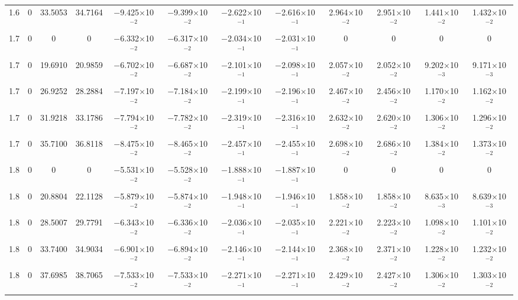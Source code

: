 \documentclass[aps,prd,twocolumn,showpacs,groupedaddress,nofootinbib]{revtex4}
\begin{document}
\begin{widetext}
\begin{table}[h]
\begin{tabular}{|c|c|c|c|c|c|c|c|c|c|c|c|}
  1.6&  0& 33.5053& 34.7164& $-$9.425$\times$10$^{-2}$& $-$9.399$\times$10$^{-2}$& $-$2.622$\times$10$^{-1}$& $-$2.616$\times$10$^{-1}$&  2.964$\times$10$^{-2}$&  2.951$\times$10$^{-2}$&  1.441$\times$10$^{-2}$&  1.432$\times$10$^{-2}$\\
  1.7&  0&  0&  0& $-$6.332$\times$10$^{-2}$& $-$6.317$\times$10$^{-2}$& $-$2.034$\times$10$^{-1}$& $-$2.031$\times$10$^{-1}$&  0&  0&  0&  0\\
  1.7&  0& 19.6910& 20.9859& $-$6.702$\times$10$^{-2}$& $-$6.687$\times$10$^{-2}$& $-$2.101$\times$10$^{-1}$& $-$2.098$\times$10$^{-1}$&  2.057$\times$10$^{-2}$&  2.052$\times$10$^{-2}$&  9.202$\times$10$^{-3}$&  9.171$\times$10$^{-3}$\\
  1.7&  0& 26.9252& 28.2884& $-$7.197$\times$10$^{-2}$& $-$7.184$\times$10$^{-2}$& $-$2.199$\times$10$^{-1}$& $-$2.196$\times$10$^{-1}$&  2.467$\times$10$^{-2}$&  2.456$\times$10$^{-2}$&  1.170$\times$10$^{-2}$&  1.162$\times$10$^{-2}$\\
  1.7&  0& 31.9218& 33.1786& $-$7.794$\times$10$^{-2}$& $-$7.782$\times$10$^{-2}$& $-$2.319$\times$10$^{-1}$& $-$2.316$\times$10$^{-1}$&  2.632$\times$10$^{-2}$&  2.620$\times$10$^{-2}$&  1.306$\times$10$^{-2}$&  1.296$\times$10$^{-2}$\\
  1.7&  0& 35.7100& 36.8118& $-$8.475$\times$10$^{-2}$& $-$8.465$\times$10$^{-2}$& $-$2.457$\times$10$^{-1}$& $-$2.455$\times$10$^{-1}$&  2.698$\times$10$^{-2}$&  2.686$\times$10$^{-2}$&  1.384$\times$10$^{-2}$&  1.373$\times$10$^{-2}$\\
  1.8&  0&  0&  0& $-$5.531$\times$10$^{-2}$& $-$5.528$\times$10$^{-2}$& $-$1.888$\times$10$^{-1}$& $-$1.887$\times$10$^{-1}$&  0&  0&  0&  0\\
  1.8&  0& 20.8804& 22.1128& $-$5.879$\times$10$^{-2}$& $-$5.874$\times$10$^{-2}$& $-$1.948$\times$10$^{-1}$& $-$1.946$\times$10$^{-1}$&  1.858$\times$10$^{-2}$&  1.858$\times$10$^{-2}$&  8.635$\times$10$^{-3}$&  8.639$\times$10$^{-3}$\\
  1.8&  0& 28.5007& 29.7791& $-$6.343$\times$10$^{-2}$& $-$6.336$\times$10$^{-2}$& $-$2.036$\times$10$^{-1}$& $-$2.035$\times$10$^{-1}$&  2.221$\times$10$^{-2}$&  2.223$\times$10$^{-2}$&  1.098$\times$10$^{-2}$&  1.101$\times$10$^{-2}$\\
  1.8&  0& 33.7400& 34.9034& $-$6.901$\times$10$^{-2}$& $-$6.894$\times$10$^{-2}$& $-$2.146$\times$10$^{-1}$& $-$2.144$\times$10$^{-1}$&  2.368$\times$10$^{-2}$&  2.371$\times$10$^{-2}$&  1.228$\times$10$^{-2}$&  1.232$\times$10$^{-2}$\\
  1.8&  0& 37.6985& 38.7065& $-$7.533$\times$10$^{-2}$& $-$7.533$\times$10$^{-2}$& $-$2.271$\times$10$^{-1}$& $-$2.271$\times$10$^{-1}$&  2.429$\times$10$^{-2}$&  2.427$\times$10$^{-2}$&  1.306$\times$10$^{-2}$&  1.303$\times$10$^{-2}$\\

\end{tabular}
\end{table}
\end{widetext}
\end{document}

